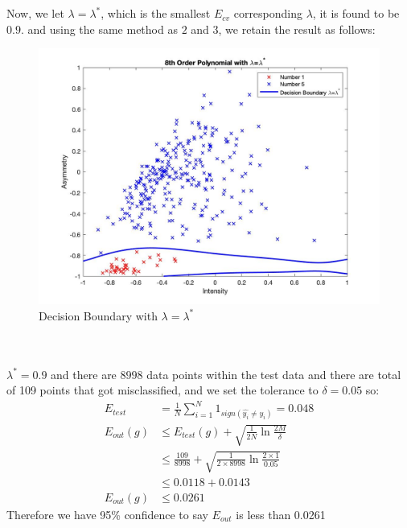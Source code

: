 \documentclass[12pt]{article}
\begin{document}
 \\\\
\indent Now, we let $\lambda = \lambda^*$, which is the smallest $E_{cv}$ corresponding $\lambda$, it is found to be $0.9$. and using the same method as $2$ and $3$, we retain the result as follows:
\begin{figure}[H]
  \centering
  \includegraphics[scale = 0.3]{3.jpg}
  \caption{Decision Boundary with $\lambda = \lambda^*$}
  \label{fig:3}
\end{figure}

\newpage
{} \\\\
\indent $\lambda^* = 0.9$ and there are $8998$ data points within the test data and there are total of 109 points that got misclassified, and we set the tolerance to $\delta = 0.05$ so:
\begin{align*} \displaystyle
	E_{test} &= \frac{1}{N}\sum_{i = 1}^{N} 1_{sign(\hat{y_i} \neq y_i)} = 0.048\\
	E_{out}(g) &\leq E_{test}(g) + \sqrt{\frac{1}{2N}\ln \frac{2M}{\delta}} \\
	&\leq \frac{109}{8998}+ \sqrt{\frac{1}{2\times8998}\ln \frac{2\times1}{0.05}} \\
	&\leq 0.0118 + 0.0143\\
	E_{out}(g) &\leq 0.0261
\end{align*}
Therefore we have 95\% confidence to say $E_{out}$ is less than 0.0261\\\\
\end{document}
